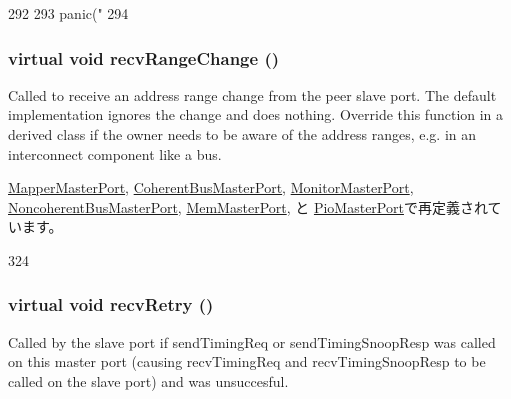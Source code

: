 \begin{DoxyCode}
292     {
293         panic("%
294     }
\end{DoxyCode}
\hypertarget{classMasterPort_af60d9c2c17fb4c9ebc5384a7e0c9f289}{
\subsubsection[{recvRangeChange}]{\setlength{\rightskip}{0pt plus 5cm}virtual void recvRangeChange ()}}
\label{classMasterPort_af60d9c2c17fb4c9ebc5384a7e0c9f289}
Called to receive an address range change from the peer slave port. The default implementation ignores the change and does nothing. Override this function in a derived class if the owner needs to be aware of the address ranges, e.g. in an interconnect component like a bus. 

\hyperlink{classAddrMapper_1_1MapperMasterPort_aecf310a01b533ae8700eccac2cf20480}{MapperMasterPort}, \hyperlink{classCoherentBus_1_1CoherentBusMasterPort_af60d9c2c17fb4c9ebc5384a7e0c9f289}{CoherentBusMasterPort}, \hyperlink{classCommMonitor_1_1MonitorMasterPort_aecf310a01b533ae8700eccac2cf20480}{MonitorMasterPort}, \hyperlink{classNoncoherentBus_1_1NoncoherentBusMasterPort_af60d9c2c17fb4c9ebc5384a7e0c9f289}{NoncoherentBusMasterPort}, \hyperlink{classRubyPort_1_1MemMasterPort_aecf310a01b533ae8700eccac2cf20480}{MemMasterPort}, と \hyperlink{classRubyPort_1_1PioMasterPort_aecf310a01b533ae8700eccac2cf20480}{PioMasterPort}で再定義されています。


\begin{DoxyCode}
324 { }
\end{DoxyCode}
\hypertarget{classMasterPort_ac1ccc3bcf7ebabb20b57fab99b2be5b0}{
\subsubsection[{recvRetry}]{\setlength{\rightskip}{0pt plus 5cm}virtual void recvRetry ()}}
\label{classMasterPort_ac1ccc3bcf7ebabb20b57fab99b2be5b0}
Called by the slave port if sendTimingReq or sendTimingSnoopResp was called on this master port (causing recvTimingReq and recvTimingSnoopResp to be called on the slave port) and was unsuccesful. 

